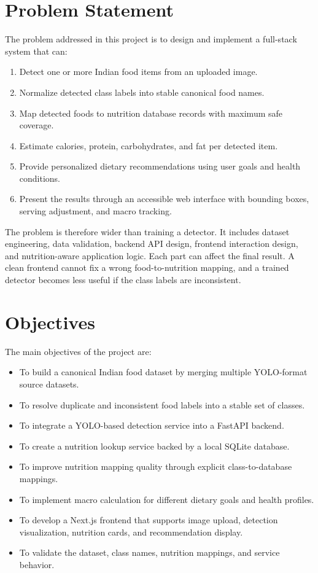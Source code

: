 \section{Problem Statement}

The problem addressed in this project is to design and implement a full-stack system that can:

\begin{enumerate}[label=\arabic*.]
    \item Detect one or more Indian food items from an uploaded image.
    \item Normalize detected class labels into stable canonical food names.
    \item Map detected foods to nutrition database records with maximum safe coverage.
    \item Estimate calories, protein, carbohydrates, and fat per detected item.
    \item Provide personalized dietary recommendations using user goals and health conditions.
    \item Present the results through an accessible web interface with bounding boxes, serving adjustment, and macro tracking.
\end{enumerate}

The problem is therefore wider than training a detector. It includes dataset engineering, data validation, backend API design, frontend interaction design, and nutrition-aware application logic. Each part can affect the final result. A clean frontend cannot fix a wrong food-to-nutrition mapping, and a trained detector becomes less useful if the class labels are inconsistent.

\section{Objectives}

The main objectives of the project are:

\begin{itemize}
    \item To build a canonical Indian food dataset by merging multiple YOLO-format source datasets.
    \item To resolve duplicate and inconsistent food labels into a stable set of classes.
    \item To integrate a YOLO-based detection service into a FastAPI backend.
    \item To create a nutrition lookup service backed by a local SQLite database.
    \item To improve nutrition mapping quality through explicit class-to-database mappings.
    \item To implement macro calculation for different dietary goals and health profiles.
    \item To develop a Next.js frontend that supports image upload, detection visualization, nutrition cards, and recommendation display.
    \item To validate the dataset, class names, nutrition mappings, and service behavior.
\end{itemize}

